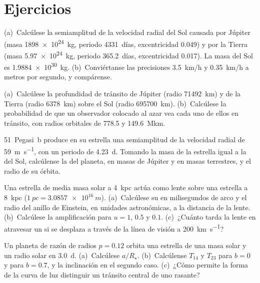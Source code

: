 \section{Ejercicios}

\begin{exercise}[$\star$]\label{exo:b3:exoplanets:1}
(a)~Calcúlese la semiamplitud de la velocidad radial del Sol causada por
Júpiter (masa \qty{1898e24}{kg}, periodo \num{4331}~días, excentricidad
0.049) y por la Tierra (masa \qty{5.97e24}{kg}, periodo \num{365.2}~días,
excentricidad 0.017). La masa del Sol es \qty{1.9884e30}{kg}.
(b)~Conviértanse las precisiones \qty{3.5}{km/h} y \qty{0.35}{km/h} a
metros por segundo, y compárense.
\end{exercise}

\begin{exercise}[$\star$]\label{exo:b3:exoplanets:2}
(a)~Calcúlese la profundidad de tránsito de Júpiter (radio \qty{71492}{km}) y de
la Tierra (radio \qty{6378}{km}) sobre el Sol (radio
\qty{695700}{km}). (b)~Calcúlese la probabilidad de que un observador colocado al
azar vea cada uno de ellos en tránsito, con radios orbitales de \num{778.5}
y \qty{149.6}{\mega km}.
\end{exercise}

\begin{exercise}[$\star$]\label{exo:b3:exoplanets:3}
51~Pegasi~b produce en su estrella una semiamplitud de la velocidad radial de
\qty{59}{m.s^{-1}}, con un periodo de \qty{4.23}{d}. Tomando la masa de la
estrella igual a la del Sol, calcúlense la  del planeta, en masas de
Júpiter y en masas terrestres, y el radio de su órbita.
\end{exercise}

\begin{exercise}[$\star$]\label{exo:b3:exoplanets:4}
Una estrella de media masa solar a \qty{4}{kpc} actúa como lente sobre una
estrella a \qty{8}{kpc} ($\qty{1}{pc} = \qty{3.0857e16}{m}$). (a)~Calcúlese su
 en milisegundos de arco y el radio del anillo de Einstein,
en unidades astronómicas, a la distancia de la lente. (b)~Calcúlese la
amplificación para $u = 1$, $0.5$ y $0.1$. (c)~¿Cuánto tarda la lente en
atravesar un  si se desplaza a través de la línea de visión a
\qty{200}{km.s^{-1}}?
\end{exercise}

\begin{exercise}[$\star\star$]\label{exo:b3:exoplanets:5}
Un planeta de razón de radios $p = 0.12$ orbita una estrella de una masa solar y
un radio solar en \qty{3.0}{d}. (a)~Calcúlese $a/R_\star$. (b)~Calcúlense
$T_{14}$ y $T_{23}$ para $b = 0$ y para $b = 0.7$, y la inclinación en el
segundo caso. (c)~¿Cómo permite la forma de la curva de luz distinguir un
tránsito central de uno rasante?
\end{exercise}

